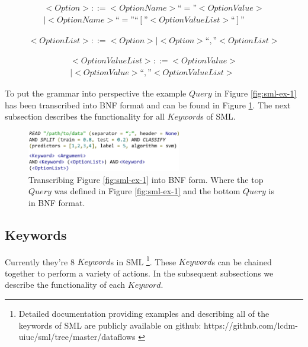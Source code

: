 \documentclass[jair,twoside,11pt,theapa]{article}
\begin{document}
\begin{equation} \label{BNF:Option}
\begin{split}
<Option> ::= <Option Name> “=” <Option Value> \\
		| <Option Name> “=” “[”<Option Value List>“]”
\end{split}
\end{equation}

\begin{equation} \label{BNF:OptionList}
\begin{split}
	<Option List> ::= <Option> | <Option> “,” <Option List>
\end{split}
\end{equation}

\begin{equation} \label{BNF:OptionValueList}
\begin{split}
<Option Value List> ::= <Option Value> \\
| <Option Value> “,” <Option Value List>
\end{split}
\end{equation}

To put the grammar into perspective the example \(Query\) in Figure \ref{fig:sml-ex-1} has been transcribed into BNF format and can be found in Figure \ref{fig:SML:BNFComp}. The next subsection describes the functionality for all  \(Keyword\)s of SML.

\begin{figure}
\includegraphics[width=0.6\textwidth]{figs/bnf_ex.png}
\centering
\caption{Transcribing Figure \ref{fig:sml-ex-1} into BNF form. Where the top \(Query\) was defined in Figure \ref{fig:sml-ex-1} and the bottom \(Query\) is in BNF format.}
\label{fig:SML:BNFComp}
\end{figure}


\subsection{Keywords}
Currently they're 8 \(Keyword\)s in SML \footnote{Detailed documentation providing examples and describing all of the keywords of SML are publicly available on github: https://github.com/lcdm-uiuc/sml/tree/master/dataflows \label{SML:Dataflow}}. These \(Keyword\)s can be chained together to perform a variety of actions. In the subsequent subsections we describe the functionality of each \(Keyword\).
\end{document}
